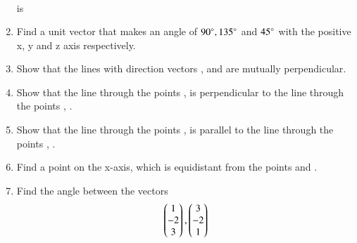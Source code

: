 \begin{enumerate}[label=\arabic*.,ref=\thesubsection.\theenumi]
\begin{multline}
\end{multline}
%
is 
\begin{enumerate}[itemsep = 2pt]
\end{enumerate}
\item Find a unit vector that makes an angle of $90\degree, 135\degree$ and $45\degree$ with the positive x, y and z axis respectively.
\item Show that the lines with direction vectors ,  and  are mutually perpendicular.
\item Show that the line through the points ,  is perpendicular to the line through the points   , .
\\
\solution 

\item Show that the line through the points ,  is parallel to the line through the points   , .
\\
\solution 

\item Find a point on the x-axis, which is equidistant from the points  and .
\\
\solution 

\item Find the angle between the vectors 
\begin{align}
\begin{pmatrix}1\\-2\\3\end{pmatrix},
\begin{pmatrix}3\\-2\\1\end{pmatrix}
\end{align}
\\
\solution 



\end{enumerate}

